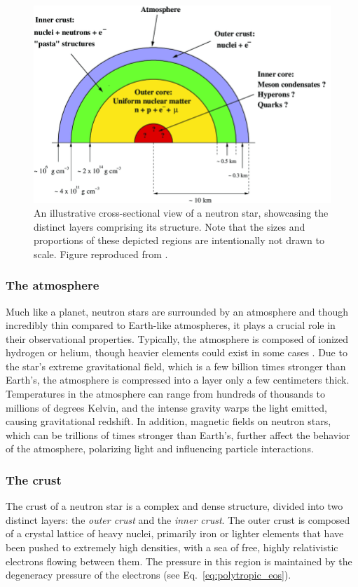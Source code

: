 \documentclass[main.tex]{subfiles}
\begin{document}
    \begin{figure}[ht!]
        \centering
        \includegraphics[scale=0.3]{figures/chapter1/ns_cross_section.png}
        \caption{An illustrative cross-sectional view of a neutron star, showcasing the distinct layers comprising its structure. Note that the sizes and proportions of these depicted regions are intentionally not drawn to scale. Figure reproduced from \cite{fiorella:mdpi20}.}
        \label{fig:ns_cross_section}
    \end{figure}

    \subsubsection{The atmosphere}
    Much like a planet, neutron stars are surrounded by an atmosphere and though incredibly thin compared to Earth-like atmospheres, it plays a crucial role in their observational properties. Typically, the atmosphere is composed of ionized hydrogen or helium, though heavier elements could exist in some cases \citep[e.g.,][]{1965ApJ...142..473O, 2009Natur.462...71H, 2012MNRAS.423.1556S}. Due to the star's extreme gravitational field, which is a few billion times stronger than Earth's, the atmosphere is compressed into a layer only a few centimeters thick. Temperatures in the atmosphere can range from hundreds of thousands to millions of degrees Kelvin, and the intense gravity warps the light emitted, causing gravitational redshift. In addition, magnetic fields on neutron stars, which can be trillions of times stronger than Earth's, further affect the behavior of the atmosphere, polarizing light and influencing particle interactions.

    \subsubsection{The crust}
    The crust of a neutron star is a complex and dense structure, divided into two distinct layers: the \textit{outer crust} and the \textit{inner crust}. The outer crust is composed of a crystal lattice of heavy nuclei, primarily iron or lighter elements that have been pushed to extremely high densities, with a sea of free, highly relativistic electrons flowing between them. The pressure in this region is maintained by the degeneracy pressure of the electrons (see Eq.~\ref{eq:polytropic_eos}).
\end{document}
